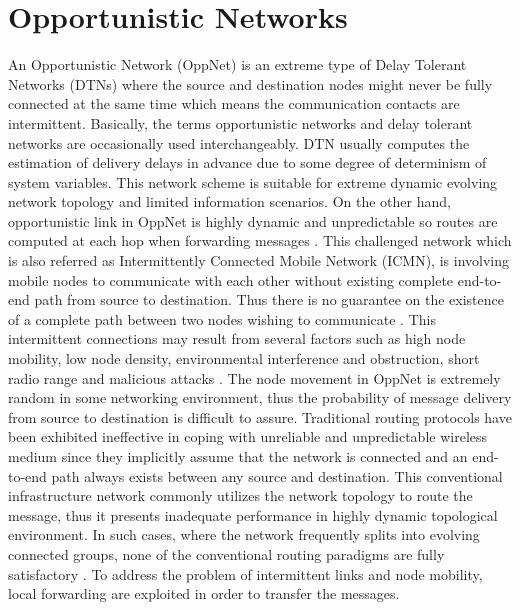 \section{Opportunistic Networks}
\label{bg:Opportunistic Networks}
An Opportunistic Network (OppNet) is an extreme type of Delay Tolerant Networks (DTNs) where the source and destination nodes might never be fully connected at the same time which means the communication contacts are intermittent.
%
Basically, the terms opportunistic networks and delay tolerant networks are occasionally used interchangeably. 
%
DTN usually computes the estimation of delivery delays in advance due to some degree of determinism of system variables. 
This network scheme is suitable for extreme dynamic evolving network topology and limited information scenarios. 
%
On the other hand, opportunistic link in OppNet is highly dynamic and unpredictable so routes are computed at each hop when forwarding messages \cite{Bujari2012a}. 
%
This challenged network which is also referred as Intermittently Connected Mobile Network (ICMN), is involving mobile nodes to communicate with each other without existing complete end-to-end path from source to destination.
Thus there is no guarantee on the existence of a complete path between two nodes wishing to communicate \cite{MWNsBook2011}.
This intermittent connections may result from several factors such as high node mobility, low node density, environmental interference and obstruction, short radio range and malicious attacks \cite{prodhan2011}.
The node movement in OppNet is extremely random in some networking environment, thus the probability of message delivery from source to destination is difficult to assure.
Traditional routing protocols have been exhibited ineffective in coping with unreliable and unpredictable wireless medium \cite{Yang2009} since they implicitly assume that the network is connected and an end-to-end path always exists between any source and destination. 
%
This conventional infrastructure network commonly utilizes the network topology to route the message, thus it presents inadequate performance in highly dynamic topological environment. 
%
In such cases, where the network frequently splits into evolving connected groups, none of the conventional routing paradigms are fully satisfactory \cite{Whitbeck2010}. 
%
To address the problem of intermittent links and node mobility, local forwarding are exploited in order to transfer the messages. 
